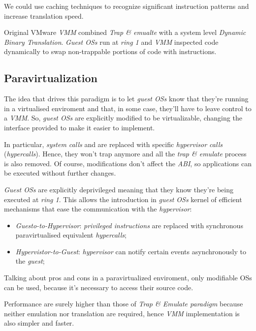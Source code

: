 \begin{note}
    We could use caching techniques to recognize significant instruction patterns
    and increase translation speed.
\end{note}
\begin{note}
    Original VMware \emph{VMM} combined \emph{Trap \& emualte} with a system
    level \emph{Dynamic Binary Translation}. \emph{Guest OSs} run at \emph{ring 1}
    and \emph{VMM} inspected code dynamically to swap non-trappable portions of
    code with  instructions.
\end{note}

\subsection{Paravirtualization}
The idea that drives this paradigm is to let \emph{guest OSs} know that
they're running in a virtualised enviroment and that, in some case, they'll
have to leave control to a \emph{VMM}. So, \emph{guest OSs} are explicitly
modified to be virtualizable, changing the interface provided to make it
easier to implement.

In particular, \emph{system calls} and  are
replaced with specific \emph{hypervisor calls} (\emph{hypercalls}). Hence,
they won't trap anymore and all the \emph{trap \& emulate} process is also
removed. Of course, modifications don't affect the \emph{ABI}, so applications
can be executed without further changes.

\emph{Guest OSs} are explicitly deprivileged meaning that they know they're being
executed at \emph{ring 1}. This allows the introduction in \emph{guest OSs}
kernel of efficient mechanisms that ease the communication with the
\emph{hypervisor}:
\begin{itemize}
    \item\emph{Guesto-to-Hypervisor}: \emph{privileged instructions} are replaced
    with synchronous paravirtualised equivalent \emph{hypercalls};
    \item\emph{Hypervistor-to-Guest}: \emph{hypervisor} can notify certain events
    asynchronously to the \emph{guest};
\end{itemize}

\bigskip\noindent
Talking about pros and cons in a paravirtualized enviroment, only modifiable
OSs can be used, because it's necessary to access their source code.

Performance are surely higher than those of \emph{Trap \& Emulate paradigm}
because neither emulation nor translation are required, hence \emph{VMM}
implementation is also simpler and faster.

